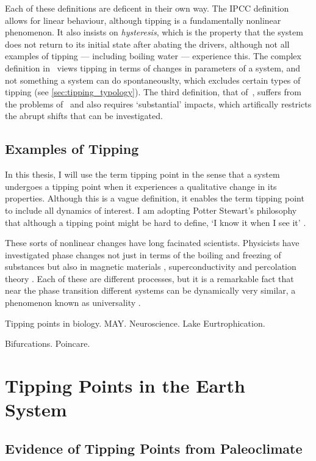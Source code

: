 Each of these definitions are deficent in their own way. The IPCC definition allows for linear behaviour, although tipping is a fundamentally nonlinear phenomenon. It also insists on \emph{hysteresis},
which is the property that the system does not return to its initial state after abating the drivers, although not all examples of tipping --- including boiling water --- experience this.
The complex definition in~\cite{Lenton2008} views tipping in terms of changes in parameters of a system, and not something a system can do spontaneouslty, which excludes certain types of
tipping (see \cref{sec:tipping_typology}). The third definition, that of~\cite{ArmstrongMcKay2022}, suffers from the problems of~\cite{Lenton2008} and also requires `substantial' impacts, which
artifically restricts the abrupt shifts that can be investigated.

\subsection{Examples of Tipping}

In this thesis, I will use the term tipping point in the sense that a system undergoes a tipping point when it experiences a qualitative change in its properties. Although this is a vague definition,
it enables the term tipping point to include all dynamics of interest. I am adopting Potter Stewart's philosophy that although a tipping point might be hard to define,
`I know it when I see it' \parencite{Stewart1964}.

These sorts of nonlinear changes have long facinated scientists. Physicists have investigated phase changes not just in terms of the boiling and freezing of substances but also
in magnetic materials \parencite{Ising1925,Onsager1944}, superconductivity \parencite{Landau1965} and percolation theory \parencite{Flory1941}. Each of these are different processes, but it is a
remarkable fact that near the phase transition different systems can be dynamically very similar, a phenomenon known as universality \parencite{Wilson1983}.

Tipping points in biology. MAY. Neuroscience. Lake Eurtrophication.

Bifurcations. Poincare.

\section{Tipping Points in the Earth System}
\subsection{Evidence of Tipping Points from Paleoclimate}
